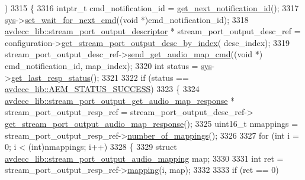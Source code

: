\begin{DoxyCode}
      )
3315     \{
3316         intptr\_t cmd\_notification\_id = \hyperlink{classcmd__line_a57486218387d1aa9d262eb7c176154ad}{get\_next\_notification\_id}();
3317         \hyperlink{classcmd__line_a485db4800e331cb4052c447fdf5d154e}{sys}->\hyperlink{classavdecc__lib_1_1system_a26b769584f10225077da47583edda33e}{set\_wait\_for\_next\_cmd}((\textcolor{keywordtype}{void} *)cmd\_notification\_id);
3318         \hyperlink{classavdecc__lib_1_1stream__port__output__descriptor}{avdecc\_lib::stream\_port\_output\_descriptor} * 
      stream\_port\_output\_desc\_ref = configuration->\hyperlink{classavdecc__lib_1_1configuration__descriptor_afc0e79843f9b98263f9be9d16197310b}{get\_stream\_port\_output\_desc\_by\_index}(
      desc\_index);
3319         stream\_port\_output\_desc\_ref->\hyperlink{classavdecc__lib_1_1stream__port__output__descriptor_a685ec3b997e066fc3530a3cd213f581b}{send\_get\_audio\_map\_cmd}((\textcolor{keywordtype}{void} *)
      cmd\_notification\_id, map\_index);
3320         \textcolor{keywordtype}{int} status = \hyperlink{classcmd__line_a485db4800e331cb4052c447fdf5d154e}{sys}->\hyperlink{classavdecc__lib_1_1system_aa63e8d1a4e51f695cdcccc9340922407}{get\_last\_resp\_status}();
3321 
3322         \textcolor{keywordflow}{if} (status == \hyperlink{namespaceavdecc__lib_affd436edb2cecd20cfd784a84f852b2bac947077909cb590b84f4b5db413080e0}{avdecc\_lib::AEM\_STATUS\_SUCCESS})
3323         \{
3324             \hyperlink{classavdecc__lib_1_1stream__port__output__get__audio__map__response}{avdecc\_lib::stream\_port\_output\_get\_audio\_map\_response}
       * stream\_port\_output\_resp\_ref = stream\_port\_output\_desc\_ref->
      \hyperlink{classavdecc__lib_1_1stream__port__output__descriptor_a4c10a3bd18d5f4e7220778ed34fe2a98}{get\_stream\_port\_output\_audio\_map\_response}();
3325             uint16\_t nmappings = stream\_port\_output\_resp\_ref->\hyperlink{classavdecc__lib_1_1stream__port__output__get__audio__map__response_a7f2372b5389cf9ba04675f3ef37439f3}{number\_of\_mappings}();
3326 
3327             \textcolor{keywordflow}{for} (\textcolor{keywordtype}{int} i = 0; i < (int)nmappings; i++)
3328             \{
3329                 \textcolor{keyword}{struct }\hyperlink{structavdecc__lib_1_1stream__port__output__audio__mapping}{avdecc\_lib::stream\_port\_output\_audio\_mapping}
       map;
3330 
3331                 \textcolor{keywordtype}{int} ret = stream\_port\_output\_resp\_ref->\hyperlink{classavdecc__lib_1_1stream__port__output__get__audio__map__response_a2b6b11e38934fc1d17f8c3028c7776af}{mapping}(i, map);
3332 
3333                 \textcolor{keywordflow}{if} (ret == 0)

\end{DoxyCode}
